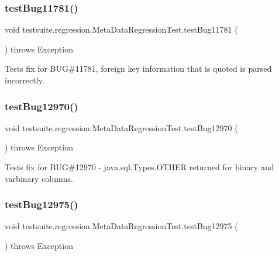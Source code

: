 \subsubsection{\texorpdfstring{test\+Bug11781()}{testBug11781()}}
{\footnotesize\ttfamily void testsuite.\+regression.\+Meta\+Data\+Regression\+Test.\+test\+Bug11781 (\begin{DoxyParamCaption}{ }\end{DoxyParamCaption}) throws Exception}

Tests fix for B\+UG\#11781, foreign key information that is quoted is parsed incorrectly. \mbox{\label{classtestsuite_1_1regression_1_1_meta_data_regression_test_a90992a3b409d173b89d677edbc407433}} 
\subsubsection{\texorpdfstring{test\+Bug12970()}{testBug12970()}}
{\footnotesize\ttfamily void testsuite.\+regression.\+Meta\+Data\+Regression\+Test.\+test\+Bug12970 (\begin{DoxyParamCaption}{ }\end{DoxyParamCaption}) throws Exception}

Tests fix for B\+UG\#12970 -\/ java.\+sql.\+Types.\+O\+T\+H\+ER returned for binary and varbinary columns. \mbox{\label{classtestsuite_1_1regression_1_1_meta_data_regression_test_ad4507d03539b3dcb6640da83424031e7}} 
\subsubsection{\texorpdfstring{test\+Bug12975()}{testBug12975()}}
{\footnotesize\ttfamily void testsuite.\+regression.\+Meta\+Data\+Regression\+Test.\+test\+Bug12975 (\begin{DoxyParamCaption}{ }\end{DoxyParamCaption}) throws Exception}

